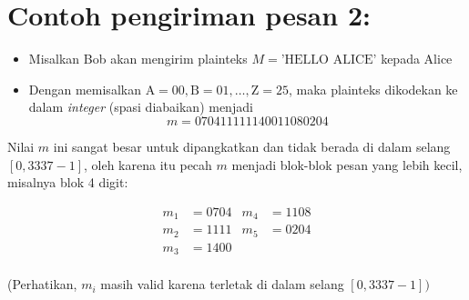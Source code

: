 \documentclass{article}
\begin{document}

\section*{Contoh pengiriman pesan 2:}
\begin{itemize}
    \item Misalkan Bob akan mengirim plainteks $M = \text{'HELLO ALICE'}$ kepada Alice
    \item Dengan memisalkan $\text{A} = 00, \text{B} = 01, \dots, \text{Z} = 25$, maka plainteks dikodekan ke dalam \textit{integer} (spasi diabaikan) menjadi
    \[ m = 070411111140011080204 \]
\end{itemize}

Nilai $m$ ini sangat besar untuk dipangkatkan dan tidak berada di dalam selang $[0, 3337-1]$, oleh karena itu pecah $m$ menjadi blok-blok pesan yang lebih kecil, misalnya blok 4 digit:

\begin{align*}
    m_1 &= 0704 & m_4 &= 1108 \\
    m_2 &= 1111 & m_5 &= 0204 \\
    m_3 &= 1400 & \\
\end{align*}

(Perhatikan, $m_i$ masih valid karena terletak di dalam selang $[0, 3337 - 1])$
\end{document}
